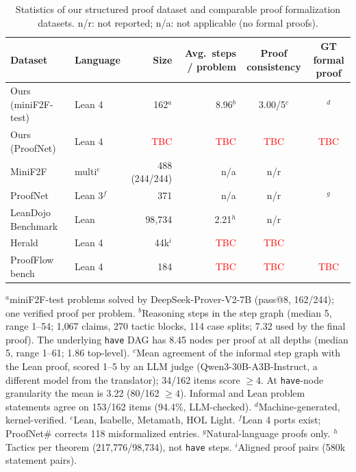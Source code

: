 \documentclass[sigconf,anonymous]{aamas}
\newcommand{\yes}{\ding{51}} %
\newcommand{\no}{\ding{55}}
\newcommand{\tbc}{\textcolor{red}{TBC}} %
\begin{document}
\begin{table}[t]
  \centering
  \small
  \caption{Statistics of our structured proof dataset and comparable proof
  formalization datasets. n/r: not reported; n/a: not applicable (no formal
  proofs).}
  \label{tab:dataset-stats}
  \begin{tabular}{@{}l l r r c c@{}}
    \toprule
    Dataset & Language & Size & Avg.\ steps / problem & Proof consistency & GT formal proof \\
    \midrule
    Ours (miniF2F-test) & Lean 4 & 162$^{a}$ & 8.96$^{b}$ & 3.00/5$^{c}$ & \yes$^{d}$ \\
    Ours (ProofNet)     & Lean 4 & \tbc & \tbc & \tbc & \tbc \\
    \midrule
    MiniF2F~\citep{minif2f2022}      & multi$^{e}$  & 488 (244/244) & n/a & n/r & \no \\
    ProofNet~\citep{proofnet2023}    & Lean 3$^{f}$ & 371           & n/a & n/r & \no$^{g}$ \\
    LeanDojo Benchmark~\citep{leandojo2023} & Lean & 98{,}734 & 2.21$^{h}$ & n/r & \yes \\
    Herald~\citep{herald2025}        & Lean 4 & 44k$^{i}$ & \tbc & \tbc & \yes \\
    ProofFlow bench~\citep{proofflow2025} & Lean 4 & 184 & \tbc & \tbc & \tbc \\
    \bottomrule
  \end{tabular}

  \vspace{2pt}
  \parbox{\textwidth}{\footnotesize
  $^{a}$miniF2F-test problems solved by DeepSeek-Prover-V2-7B (pass@8, 162/244);
  one verified proof per problem.
  $^{b}$Reasoning steps in the step graph (median 5, range 1--54; 1{,}067
  claims, 270 tactic blocks, 114 case splits; 7.32 used by the final proof).
  The underlying \texttt{have} DAG has 8.45 nodes per proof at all depths
  (median 5, range 1--61; 1.86 top-level).
  $^{c}$Mean agreement of the informal step graph with the Lean proof, scored
  1--5 by an LLM judge (Qwen3-30B-A3B-Instruct, a different model from the
  translator); 34/162 items score $\geq 4$. At \texttt{have}-node granularity
  the mean is 3.22 (80/162 $\geq 4$). Informal and Lean problem statements agree
  on 153/162 items (94.4\%, LLM-checked).
  $^{d}$Machine-generated, kernel-verified.
  $^{e}$Lean, Isabelle, Metamath, HOL Light.
  $^{f}$Lean 4 ports exist; ProofNet\# corrects 118 misformalized entries.
  $^{g}$Natural-language proofs only.
  $^{h}$Tactics per theorem (217{,}776/98{,}734), not \texttt{have} steps.
  $^{i}$Aligned proof pairs (580k statement pairs).}
\end{table}
\end{document}

